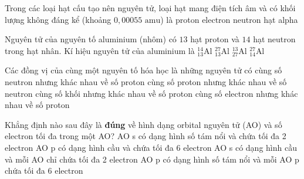 \begin{ex}
    Trong các loại hạt cấu tạo nên nguyên tử, loại hạt mang điện tích âm và có khối lượng không đáng kể (khoảng $0{,}00055\text{ amu}$) là
    \choice
    {proton}
    {\True electron}
    {neutron}
    {hạt alpha}
\end{ex}

\begin{ex}
    Nguyên tử của nguyên tố aluminium (nhôm) có $13$ hạt proton và $14$ hạt neutron trong hạt nhân. Kí hiệu nguyên tử của aluminium là
    \choice
    {$^{14}_{13}\text{Al}$}
    {\True $^{27}_{13}\text{Al}$}
    {$^{13}_{27}\text{Al}$}
    {$^{27}_{14}\text{Al}$}
\end{ex}

\begin{ex}
    Các đồng vị của cùng một nguyên tố hóa học là những nguyên tử có
    \choice
    {cùng số neutron nhưng khác nhau về số proton}
    {\True cùng số proton nhưng khác nhau về số neutron}
    {cùng số khối nhưng khác nhau về số proton}
    {cùng số electron nhưng khác nhau về số proton}
\end{ex}

\begin{ex}
    Khẳng định nào sau đây là \textbf{đúng} về hình dạng orbital nguyên tử (AO) và số electron tối đa trong một AO?
    \choice
    {AO s có dạng hình số tám nổi và chứa tối đa 2 electron}
    {AO p có dạng hình cầu và chứa tối đa 6 electron}
    {\True AO s có dạng hình cầu và mỗi AO chỉ chứa tối đa 2 electron}
    {AO p có dạng hình số tám nổi và mỗi AO p chứa tối đa 6 electron}
\end{ex}

